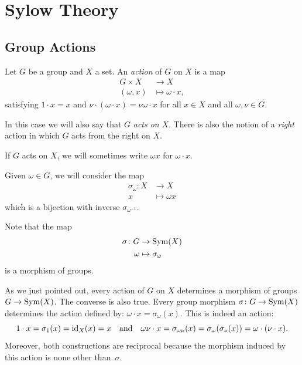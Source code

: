 \chapter{Sylow Theory}
\section{Group Actions}
\begin{defn}
    Let\/ $G$ be a group and $X$ a set. An \textsl{action} of\/ $G$ on $X$ is a map
    \begin{align*}
        G\times X&\to X\\
        (\omega,x)&\mapsto \omega\cdot x,
    \end{align*}
    satisfying $1\cdot x=x$ and\/ $\nu\cdot(\omega\cdot x)=\nu\omega\cdot x$ for all\/ $x\in X$ and all\/ $\omega,\nu\in G$.

    In this case we will also say that\/ $G$ \textsl{acts on\/} $X$. There is also the notion of a \textsl{right} action in which\/ $G$ acts from the right on $X$.
\end{defn}

\begin{ntn}
    If\/ $G$ acts on $X$, we will sometimes write $\omega x$ for $\omega\cdot x$.
    
    Given $\omega\in G$, we will consider the map
    \begin{align*}
        \sigma_\omega\colon X&\to X\\
        x&\mapsto \omega x
    \end{align*}
    which is a bijection with inverse $\sigma_{\omega^{-1}}$.
    
    Note that the map
    \begin{align*}
        \sigma\colon G&\to{\rm Sym}(X)\\
        \omega&\mapsto \sigma_\omega
    \end{align*}
    is a morphism of groups.
\end{ntn}

\begin{rem}\label{actions-are-group-morphisms}
    As we just pointed out, every action of\/ $G$ on\/ $X$ determines a morphism of groups\/ $G\to{\rm Sym}(X)$. The converse is also true. Every group morphism\/ $\sigma\colon G\to{\rm Sym}(X)$ determines the action defined by: $\omega\cdot x=\sigma_\omega(x)$. This is indeed an action:
    $$
        1\cdot x=\sigma_1(x)=\operatorname{id}_X(x)=x\quad\text{\upshape and}\quad
        \omega\nu\cdot x=\sigma_{\omega\nu}(x)=\sigma_\omega(\sigma_\nu(x))=\omega\cdot(\nu\cdot x).
    $$
    Moreover, both constructions are reciprocal because the morphism induced by this action is none other than\/~$\sigma$.
\end{rem}

